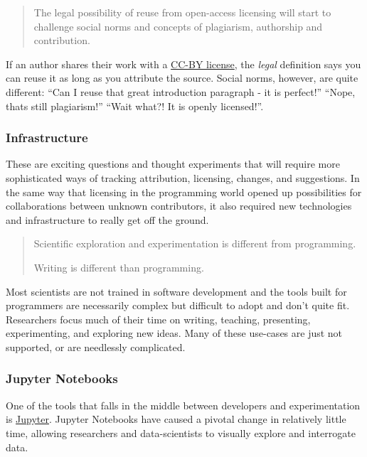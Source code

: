 \begin{quote}
  The legal possibility of reuse from open-access licensing will start to challenge social norms and concepts of plagiarism, authorship and contribution.
\end{quote}

If an author shares their work with a \href{https://creativecommons.org/licenses/by/2.0/}{CC-BY license}, the \textit{legal} definition says you can reuse it as long as you attribute the source. Social norms, however, are quite different: “Can I reuse that great introduction paragraph - it is perfect!” “Nope, thats still plagiarism!” “Wait what?! It is openly licensed!”.

\subsubsection*{Infrastructure}

These are exciting questions and thought experiments that will require more sophisticated ways of tracking attribution, licensing, changes, and suggestions. In the same way that licensing in the programming world opened up possibilities for collaborations between unknown contributors, it also required new technologies and infrastructure to really get off the ground.

\begin{quote}
  Scientific exploration and experimentation is different from programming.

  Writing is different than programming.
\end{quote}

Most scientists are not trained in software development and the tools built for programmers are necessarily complex but difficult to adopt and don’t quite fit. Researchers focus much of their time on writing, teaching, presenting, experimenting, and exploring new ideas. Many of these use-cases are just not supported, or are needlessly complicated.

\subsubsection*{Jupyter Notebooks}

One of the tools that falls in the middle between developers and experimentation is \href{https://jupyter.org/}{Jupyter}. Jupyter Notebooks have caused a pivotal change in relatively little time, allowing researchers and data-scientists to visually explore and interrogate data.

